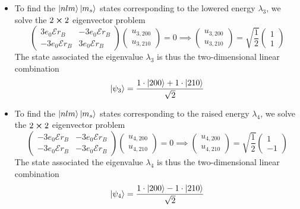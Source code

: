 \documentclass[11pt, a4paper]{article}
\newcommand{\p}{\psi}  %
\newcommand{\E}{\mathcal{E}}  %
\begin{document}
\begin{itemize}
	\item To find the $ \ket{nlm}\ket{m_{s}} $ states corresponding to the lowered energy $ \lambda_{3} $, we solve the $ 2 \cross 2 $ eigenvector problem
	\begin{equation*}
		\begin{pmatrix}
		3e_{0}\E r_{B} & -3e_{0}\E r_{B} \\
		- 3e_{0}\E r_{B} & 3e_{0}\E r_{B}
		\end{pmatrix}
		\begin{pmatrix}
			u_{3, 200}\\
			u_{3, 210}
		\end{pmatrix}
		 = 0
		\implies 
		\begin{pmatrix}
			u_{3, 200}\\
			u_{3, 210}
		\end{pmatrix} 
		 = \sqrt{\frac{1}{2}}
		 \begin{pmatrix}
		 1\\
		 1
		 \end{pmatrix}
	\end{equation*}
	The state associated the eigenvalue $ \lambda_{3} $ is thus the two-dimensional linear combination
	\begin{equation*}
		\ket{\p_{3}} = \frac{1\cdot \ket{200} + 1\cdot \ket{210}}{\sqrt{2}}
	\end{equation*}
	
	\item To find the $ \ket{nlm}\ket{m_{s}} $ states corresponding to the raised energy $ \lambda_{4} $, we solve the $ 2 \cross 2 $ eigenvector problem
	\begin{equation*}
		\begin{pmatrix}
		-3e_{0}\E r_{B} & -3e_{0}\E r_{B} \\
		-3e_{0}\E r_{B} & -3e_{0}\E r_{B}
		\end{pmatrix}
		\begin{pmatrix}
			u_{4, 200}\\
			u_{4, 210}
		\end{pmatrix}
		 = 0
		\implies 
		\begin{pmatrix}
			u_{4, 200}\\
			u_{4, 210}
		\end{pmatrix} 
	 = \sqrt{\frac{1}{2}}
	 \begin{pmatrix}
	 1\\
	 -1
	 \end{pmatrix}
	\end{equation*}
	The state associated the eigenvalue $ \lambda_{4} $ is thus the two-dimensional linear combination
	\begin{equation*}
		\ket{\p_{4}} = \frac{1\cdot \ket{200} - 1\cdot \ket{210}}{\sqrt{2}}
	\end{equation*}
\end{itemize}
	
\end{document}
